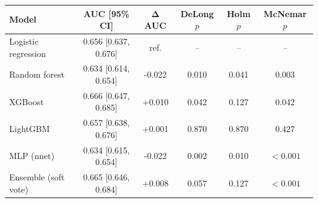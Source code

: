 \begin{tabular}{lccccc}
\toprule
\textbf{Model} & \textbf{AUC [95\% CI]} & $\boldsymbol{\Delta}$\textbf{AUC} & \textbf{DeLong $p$} & \textbf{Holm $p$} & \textbf{McNemar $p$} \\
\midrule
Logistic regression & 0.656 [0.637, 0.676] & ref. & -- & -- & -- \\
Random forest & 0.634 [0.614, 0.654] & -0.022 & 0.010 & 0.041 & 0.003 \\
XGBoost & 0.666 [0.647, 0.685] & +0.010 & 0.042 & 0.127 & 0.042 \\
LightGBM & 0.657 [0.638, 0.676] & +0.001 & 0.870 & 0.870 & 0.427 \\
MLP (nnet) & 0.634 [0.615, 0.654] & -0.022 & 0.002 & 0.010 & $<0.001$ \\
Ensemble (soft vote) & 0.665 [0.646, 0.684] & +0.008 & 0.057 & 0.127 & $<0.001$ \\
\bottomrule
\end{tabular}
